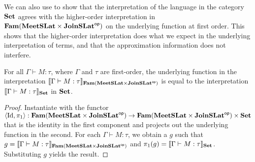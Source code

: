 We can also use  to show that the
interpretation of the language in the category $\mathbf{Set}$ agrees with the
higher-order interpretation in $\mathbf{Fam}(\mathbf{MeetSLat} \times \mathbf{JoinSLat}^{\mathsf{op}})$
on the underlying function at first order. This shows that the
higher-order interpretation does what we expect in the underlying
interpretation of terms, and that the approximation information does
not interfere.

\begin{theorem}
  \label{thm:underlying-interp-equal} For all
  $\Gamma \vdash M : \tau$, where $\Gamma$ and $\tau$ are first-order,
  the underlying function in the interpretation
  $\llbracket \Gamma \vdash M : \tau \rrbracket_{\mathbf{Fam}(\mathbf{MeetSLat} \times
    \mathbf{JoinSLat}^{\mathsf{op}})}$ is equal to the interpretation
  $\llbracket \Gamma \vdash M : \tau \rrbracket_{\mathbf{Set}}$ in $\mathbf{Set}$.
\end{theorem}

\begin{proof}
  Instantiate  with the functor
  $\langle \mathrm{Id} , \pi_1 \rangle : \mathbf{Fam}(\mathbf{MeetSLat} \times
  \mathbf{JoinSLat}^{\mathsf{op}}) \to \mathbf{Fam}(\mathbf{MeetSLat} \times \mathbf{JoinSLat}^{\mathsf{op}}) \times \mathbf{Set}$
  that is the identity in the first component and projects out the
  underlying function in the second. For each
  $\Gamma \vdash M : \tau$, we obtain a $g$ such that
  $g = \llbracket \Gamma \vdash M : \tau \rrbracket_{\mathbf{Fam}(\mathbf{MeetSLat} \times
    \mathbf{JoinSLat}^{\mathsf{op}})}$ and
  $\pi_1(g) = \llbracket \Gamma \vdash M : \tau \rrbracket_{\mathbf{Set}}$. Substituting $g$
  yields the result.
\end{proof}

